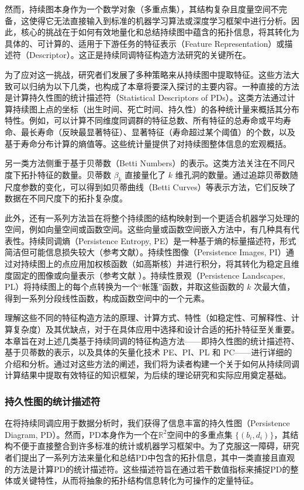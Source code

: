 然而，持续图本身作为一个数学对象（多重点集），其结构复杂且度量空间不完备，这使得它无法直接输入到标准的机器学习算法或深度学习框架中进行分析。因此，核心的挑战在于如何有效地量化和总结持续图中蕴含的拓扑信息，将其转化为具体的、可计算的、适用于下游任务的特征表示（Feature Representation）或描述符（Descriptor）。这正是持续同调特征构造方法研究的关键所在\cite{1021736289.nh}。

为了应对这一挑战，研究者们发展了多种策略来从持续图中提取特征。这些方法大致可以归纳为以下几类，也构成了本章将要深入探讨的主要内容。一种直接的方法是计算持久性图的统计描述符（Statistical Descriptors of PDs）。这类方法通过计算持续图上点的坐标（出生时间、死亡时间、持久性）的各种统计量来概括其分布特性。例如，可以计算不同维度同调群的特征总数、所有特征的总寿命或平均寿命、最长寿命（反映最显著特征）、显著特征（寿命超过某个阈值）的个数，以及基于寿命分布计算的熵值等。这些统计量提供了对持续图整体信息的宏观概括。

另一类方法侧重于基于贝蒂数（Betti Numbers）的表示。这类方法关注在不同尺度下拓扑特征的数量。贝蒂数 $\beta_k$ 直接量化了 $k$ 维孔洞的数量。通过追踪贝蒂数随尺度参数的变化，可以得到如贝蒂曲线（Betti Curves）等表示方法，它们反映了数据在不同尺度下的拓扑复杂度。

此外，还有一系列方法旨在将整个持续图的结构映射到一个更适合机器学习处理的空间，例如向量空间或函数空间。这些向量或函数空间嵌入方法中，有几种具有代表性。持续同调熵（Persistence Entropy, PE）是一种基于熵的标量描述符，形式简洁但可能信息损失较大（参考文献\cite{atienza2020stability}）。持续性图像（Persistence Images, PI）通过对持续图上的点应用加权核函数（如高斯核）并进行积分，将其转化为稳定且维度固定的图像或向量表示（参考文献\cite{adams2017persistence} ）。持续性景观（Persistence Landscapes, PL）将持续图上的每个点转换为一个“帐篷”函数，并取这些函数的 $k$ 次最大值，得到一系列分段线性函数，构成函数空间中的一个元素。

理解这些不同的特征构造方法的原理、计算方式、特性（如稳定性、可解释性、计算复杂度）及其优缺点，对于在具体应用中选择和设计合适的拓扑特征至关重要。本章旨在对上述几类基于持续同调的特征构造方法——即持久性图的统计描述符、基于贝蒂数的表示，以及具体的矢量化技术 PE、PI、PL 和 PC——进行详细的介绍和分析。通过对这些方法的阐述，我们将为读者构建一个关于如何从持续同调计算结果中提取有效特征的知识框架，为后续的理论研究和实际应用奠定基础。

\subsubsection{持久性图的统计描述符}
\label{sec:pd_stats}
在将持续同调应用于数据分析时，我们获得了信息丰富的持久性图（Persistence Diagram, PD）。然而，PD本身作为一个在$\mathbb{R}^2$空间中的多重点集 $\{(b_i, d_i)\}$，其结构不便于直接整合到许多标准的统计或机器学习框架中。为了克服这一障碍，研究者们提出了一系列方法来量化和总结PD中包含的拓扑信息，其中一类直接且直观的方法是计算PD的统计描述符。这些描述符旨在通过若干数值指标来捕捉PD的整体或关键特性，从而将抽象的拓扑结构信息转化为可操作的定量特征。

